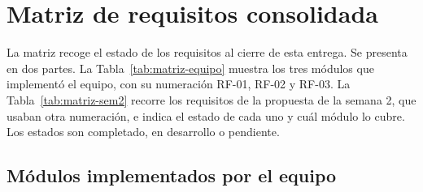 
\providecommand{\evus}{\textunderscore\allowbreak}
\providecommand{\ev}[1]{{\texttt{\scriptsize\let\_\evus #1}}}

\section{Matriz de requisitos consolidada}

La matriz recoge el estado de los requisitos al cierre de esta entrega. Se presenta en dos
partes. La Tabla~\ref{tab:matriz-equipo} muestra los tres módulos que implementó el equipo,
con su numeración RF-01, RF-02 y RF-03. La Tabla~\ref{tab:matriz-sem2} recorre los
requisitos de la propuesta de la semana 2, que usaban otra numeración, e indica el estado de
cada uno y cuál módulo lo cubre. Los estados son completado, en desarrollo o pendiente.

\subsection{Módulos implementados por el equipo}

